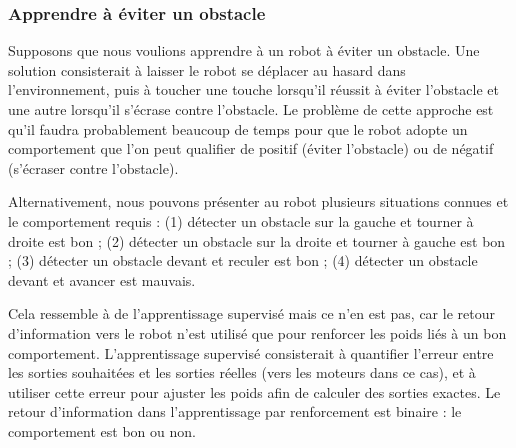 \subsubsection*{Apprendre à éviter un obstacle}

Supposons que nous voulions apprendre à un robot à éviter un obstacle. Une solution consisterait à laisser le robot se déplacer au hasard dans l'environnement, puis à toucher une touche lorsqu'il réussit à éviter l'obstacle et une autre lorsqu'il s'écrase contre l'obstacle. Le problème de cette approche est qu'il faudra probablement beaucoup de temps pour que le robot adopte un comportement que l'on peut qualifier de positif (éviter l'obstacle) ou de négatif (s'écraser contre l'obstacle).

Alternativement, nous pouvons présenter au robot plusieurs situations connues et le comportement requis : (1) détecter un obstacle sur la gauche et tourner à droite est bon ; (2) détecter un obstacle sur la droite et tourner à gauche est bon ; (3) détecter un obstacle devant et reculer est bon ; (4) détecter un obstacle devant et avancer est mauvais.

Cela ressemble à de l'apprentissage supervisé mais ce n'en est pas, car le retour d'information vers le robot n'est utilisé que pour renforcer les poids liés à un bon comportement. L'apprentissage supervisé consisterait à quantifier l'erreur entre les sorties souhaitées et les sorties réelles (vers les moteurs dans ce cas), et à utiliser cette erreur pour ajuster les poids afin de calculer des sorties exactes. Le retour d'information dans l'apprentissage par renforcement est binaire : le comportement est bon ou non.


